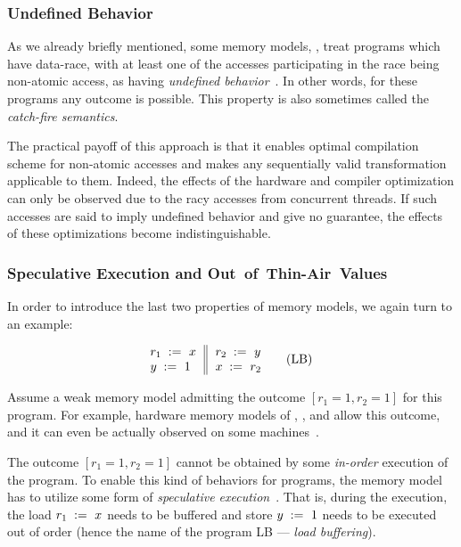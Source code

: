 \subsubsection{Undefined Behavior}
\label{sec:background:ub}

As we already briefly mentioned, some memory models, 
\eg \CPP, treat programs which have data-race, 
with at least one of the accesses participating in the race 
being non-atomic access, as having \emph{undefined behavior}~\cite{Boehm-Adve:PLDI08}.
In other words, for these programs any outcome is possible. 
This property is also sometimes called the \emph{catch-fire semantics}.
  
The practical payoff of this approach  
is that it enables optimal compilation scheme 
for non-atomic accesses and makes any sequentially valid 
transformation applicable to them.  
Indeed, the effects of the hardware and compiler 
optimization can only be observed due to the racy accesses
from concurrent threads. If such accesses are said 
to imply undefined behavior and give no guarantee, 
the effects of these optimizations become indistinguishable.

\subsubsection{Speculative Execution and Out~of~Thin-Air~Values}
\label{sec:background:oota}

In order to introduce the last two properties 
of memory models, we again turn to an example: 

\begin{equation*}
\inarrII{
  \readInst{}{r_1}{x}     \\
  \writeInst{}{y}{1}      \\
}{
  \readInst{}{r_2}{y}     \\
  \writeInst{}{x}{r_2}    \\
}
\tag{LB}\label{ex:lb}
\end{equation*}

Assume a weak memory model admitting 
the outcome ${[r_1=1, r_2=1]}$ for this program.
For example, hardware memory models of 
, , and \POWER
allow this outcome, and it can even be 
actually observed on some  
machines~\cite{Maranget-al:Tutorial2012}.

The outcome ${[r_1=1, r_2=1]}$ cannot be obtained by some 
\emph{in-order} execution of the program. 
To enable this kind of behaviors for programs, 
the memory model has to utilize some form of 
\emph{speculative execution}~\cite{Boudol-Petri:ESOP10, Boehm-Demsky:MSPC14}.
That is, during the execution, the load $r_1\;:=_{}\;x$
needs to be buffered and store $y\;:=_{}\;1$ 
needs to be executed out of order
(hence the name of the program LB --- \emph{load buffering}).

